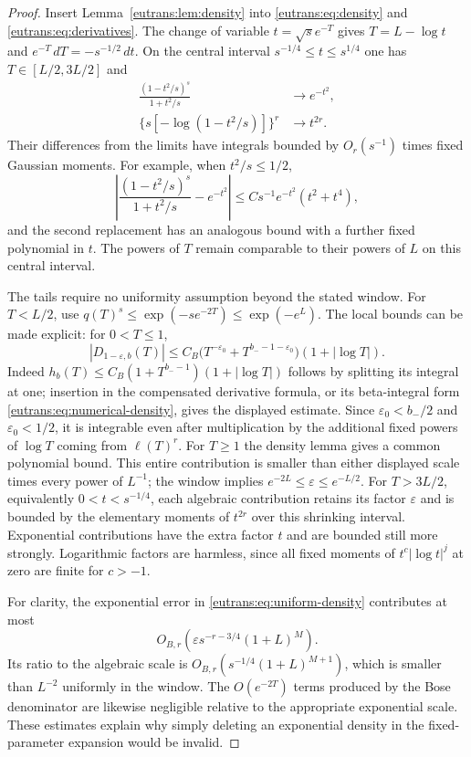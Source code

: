 \documentclass[11pt,a4paper]{article}
\numberwithin{equation}{section}
\theoremstyle{definition}
\theoremstyle{remark}
\begin{document}
\begin{proof}
Insert Lemma~\ref{eutrans:lem:density} into
\eqref{eutrans:eq:density} and \eqref{eutrans:eq:derivatives}. The
change of variable $t=\sqrt{s}e^{-T}$ gives $T=L-\log t$ and
$e^{-T}\,dT=-s^{-1/2}\,dt$. On the central interval
$s^{-1/4}\leq t\leq s^{1/4}$ one has $T\in[L/2,3L/2]$ and
\begin{align*}
 \frac{(1-t^2/s)^s}{1+t^2/s}&\longrightarrow e^{-t^2},\\
 \{s[-\log(1-t^2/s)]\}^r&\longrightarrow t^{2r}.
\end{align*}
Their differences from the limits have integrals bounded by
$O_r(s^{-1})$ times fixed Gaussian moments. For example, when
$t^2/s\leq1/2$,
\[
 \left|\frac{(1-t^2/s)^s}{1+t^2/s}-e^{-t^2}\right|
 \leq C s^{-1}e^{-t^2}(t^2+t^4),
\]
and the second replacement has an analogous bound with a further
fixed polynomial in $t$. The powers of $T$ remain comparable to
their powers of $L$ on this central interval.

The tails require no uniformity assumption beyond the stated window.
For $T<L/2$, use $q(T)^s\leq\exp(-s e^{-2T})\leq\exp(-e^L)$.
The local bounds can be made explicit: for $0<T\leq1$,
\[
 |D_{1-\varepsilon,b}(T)|\leq C_B
 \bigl(T^{-\varepsilon_0}+T^{b_--1-\varepsilon_0}\bigr)
                                  (1+|\log T|).
\]
Indeed $h_b(T)\leq C_B(1+T^{b_--1})(1+|\log T|)$ follows by
splitting its integral at one; insertion in the compensated
derivative formula, or its beta-integral form
\eqref{eutrans:eq:numerical-density}, gives the displayed estimate.
Since $\varepsilon_0<b_-/2$ and $\varepsilon_0<1/2$, it is
integrable even after multiplication by the additional fixed powers
of $\log T$ coming from $\ell(T)^r$. For $T\geq1$ the density lemma
gives a common polynomial bound. This entire contribution is smaller
than either displayed scale times every power of $L^{-1}$; the
window implies $e^{-2L}\leq\varepsilon\leq e^{-L/2}$.
For $T>3L/2$, equivalently $0<t<s^{-1/4}$, each algebraic contribution
retains its factor $\varepsilon$ and is bounded by the elementary
moments of $t^{2r}$ over this shrinking interval. Exponential
contributions have the extra factor $t$ and are bounded still more
strongly. Logarithmic factors are harmless, since all fixed moments
of $t^c|\log t|^j$ at zero are finite for $c>-1$.

For clarity, the exponential error in
\eqref{eutrans:eq:uniform-density} contributes at most
\[
 O_{B,r}\left(\varepsilon s^{-r-3/4}(1+L)^M\right).
\]
Its ratio to the algebraic scale is
$O_{B,r}(s^{-1/4}(1+L)^{M+1})$, which is smaller than $L^{-2}$
uniformly in the window. The $O(e^{-2T})$ terms produced by the
Bose denominator are likewise negligible relative to the appropriate
exponential scale. These estimates explain why simply deleting an
exponential density in the fixed-parameter expansion would be invalid.


\end{proof}
\end{document}
